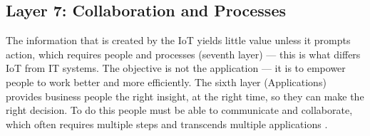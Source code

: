 
\subsection{Layer 7: Collaboration and Processes}
\label{sec:iot-model-layer7}


The information that is created by the \acs{IoT} yields little value unless it prompts action, which requires people and processes (seventh layer) — this is what differs \acs{IoT} from \acl{IT} systems. The objective is not the application — it is to empower people to work better and more efficiently. The sixth layer (Applications) provides business people the right insight, at the right time, so they can make the right decision. To do this people must be able to communicate and collaborate, which often requires multiple steps and 
transcends multiple applications \cite{Cisco2014}.

